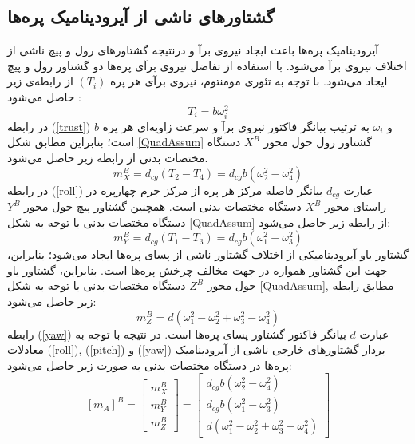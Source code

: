 \subsection{گشتاورهای ناشی از آيرودينامیک پره‌ها}
آیرودینامیک پره‌ها باعث ایجاد نیروی برآ و درنتیجه گشتاورهای رول و پیچ ناشی از اختلاف نیروی 
برآ می‌شود. با استفاده از تفاضل نیروی برآی پره‌ها دو گشتاور رول و پیچ ایجاد می‌شود. با توجه به تئوری مومنتوم، نیروی برآی هر پره 
$(T_i)$
از رابطه‌ی زیر حاصل می‌شود
\cite{Sharifi}
:
\begin{equation}\label{trust}
	T_i = b\omega_i^2
\end{equation}
در رابطه
(\ref{trust})
$b$
و 
$\omega_i$
به ترتیب بیانگر فاکتور نیروی برآ و سرعت زاویه‌ای هر پره است؛ بنابراین مطابق شکل 
\ref{QuadAssum}
گشتاور رول حول محور
$X^B$
دستگاه مختصات بدنی از رابطه زیر حاصل می‌شود.
\begin{equation}\label{roll}
	m_X^B = d_{cg}(T_2-T_4) = d_{cg}b(\omega_2^2-\omega_4^2)
\end{equation}
در رابطه 
(\ref{roll})
عبارت 
$d_{cg}$
بیانگر فاصله مرکز هر پره از مرکز جرم چهارپره در راستای محور
$X^B$
دستگاه مختصات بدنی است. همچنین گشتاور پیچ حول محور 
$Y^B$
دستگاه مختصات بدنی با توجه به شكل
\ref{QuadAssum}
از رابطه زیر حاصل می‌شود:
\begin{equation}\label{pitch}
	m_Y^B = d_{cg}(T_1-T_3) = d_{cg}b(\omega_1^2-\omega_3^2)
\end{equation}
گشتاور یاو آیرودینامیكی از اختلاف گشتاور ناشی از پسای پره‌ها ایجاد می‌شود؛ بنابراین، جهت این 
گشتاور همواره در جهت مخالف چرخش پره‌ها است. بنابراین، گشتاور یاو حول محور
$Z^B$
دستگاه مختصات بدنی با توجه به شكل
\ref{QuadAssum},
مطابق رابطه زیر حاصل می‌شود:
\begin{equation}\label{yaw}
	m_Z^B = d(\omega_1^2-\omega_2^2+\omega_3^2-\omega_4^2)
\end{equation}
رابطه 
(\ref{yaw})
عبارت 
$d$
بیانگر فاکتور گشتاور پسای پره‌ها است. در نتیجه با توجه به معادلات
(\ref{roll}),
(\ref{pitch})
و
(\ref{yaw})
بردار گشتاورهای خارجی ناشی از آیرودینامیک پره‌ها در دستگاه مختصات بدنی به صورت زیر حاصل می‌شود:
\begin{equation}\label{finaltorque}
	\left[m_A\right]^B = \begin{bmatrix}
		m_X^B\\m_Y^B\\m_Z^B
	\end{bmatrix}
 =  \begin{bmatrix}
 	d_{cg}b(\omega_2^2-\omega_4^2)\\
 	d_{cg}b(\omega_1^2-\omega_3^2)\\
 	d(\omega_1^2-\omega_2^2+\omega_3^2-\omega_4^2)
 \end{bmatrix}
\end{equation}
